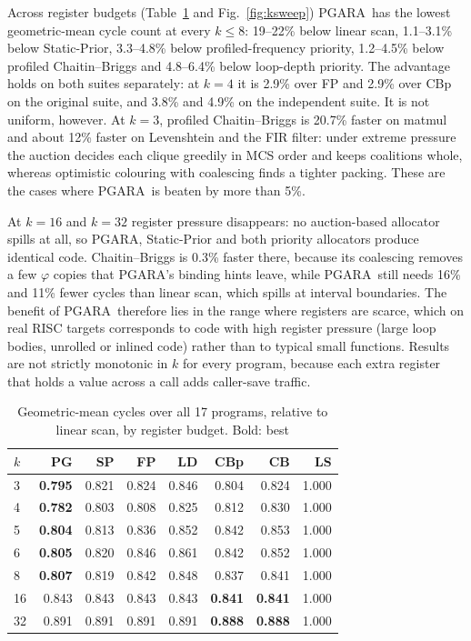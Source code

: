 \documentclass{ieeeaccess}
\newcommand{\MG}{PGARA}
\begin{document}
Across register budgets (Table~\ref{tab:gm} and Fig.~\ref{fig:ksweep})
\MG\ has the lowest geometric-mean cycle count at every $k\le 8$:
19--22\% below linear scan, 1.1--3.1\% below Static-Prior, 3.3--4.8\%
below profiled-frequency priority, 1.2--4.5\% below profiled
Chaitin--Briggs and 4.8--6.4\% below loop-depth priority. The advantage
holds on both suites separately: at $k=4$ it is 2.9\% over FP and 2.9\%
over CBp on the original suite, and 3.8\% and 4.9\% on the independent
suite. It is not uniform, however. At $k=3$, profiled Chaitin--Briggs
is 20.7\% faster on matmul and about 12\% faster on Levenshtein and the
FIR filter: under extreme pressure the auction decides each clique
greedily in MCS order and keeps coalitions whole, whereas optimistic
colouring with coalescing finds a tighter packing. These are the cases
where \MG\ is beaten by more than 5\%.

At $k=16$ and $k=32$ register pressure disappears: no auction-based
allocator spills at all, so \MG, Static-Prior and both priority
allocators produce identical code. Chaitin--Briggs is 0.3\% faster
there, because its coalescing removes a few $\varphi$ copies that
\MG's binding hints leave, while \MG\ still needs 16\% and 11\% fewer
cycles than linear scan, which spills at interval boundaries. The benefit of \MG\
therefore lies in the range where registers are scarce, which on real
RISC targets corresponds to code with high register pressure (large
loop bodies, unrolled or inlined code) rather than to typical small
functions. Results are not strictly monotonic in $k$ for every
program, because each extra register that holds a value across a call
adds caller-save traffic.

\begin{table}[t]
\centering
\caption{Geometric-mean cycles over all 17 programs, relative to linear
scan, by register budget. Bold: best}
\label{tab:gm}
\footnotesize
\setlength{\tabcolsep}{3pt}
\begin{tabular}{@{}lrrrrrrr@{}}
\toprule
$k$ & PG & SP & FP & LD & CBp & CB & LS \\
\midrule
3 & \textbf{0.795} & 0.821 & 0.824 & 0.846 & 0.804 & 0.824 & 1.000 \\
4 & \textbf{0.782} & 0.803 & 0.808 & 0.825 & 0.812 & 0.830 & 1.000 \\
5 & \textbf{0.804} & 0.813 & 0.836 & 0.852 & 0.842 & 0.853 & 1.000 \\
6 & \textbf{0.805} & 0.820 & 0.846 & 0.861 & 0.842 & 0.852 & 1.000 \\
8 & \textbf{0.807} & 0.819 & 0.842 & 0.848 & 0.837 & 0.841 & 1.000 \\
16 & 0.843 & 0.843 & 0.843 & 0.843 & \textbf{0.841} & \textbf{0.841} & 1.000 \\
32 & 0.891 & 0.891 & 0.891 & 0.891 & \textbf{0.888} & \textbf{0.888} & 1.000 \\
\bottomrule
\end{tabular}
\end{table}
\end{document}

